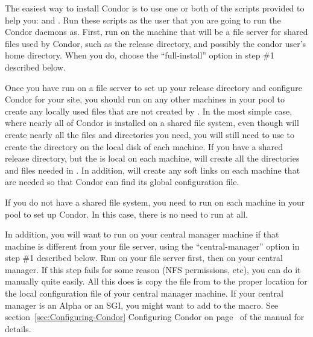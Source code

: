 The easiest way to install Condor is to use one or both of the scripts
provided to help you:  and .
Run these scripts as the user that you are going to run the Condor
daemons as.  First, run  on the machine that will be a
file server for shared files used by Condor, such as the release
directory, and possibly the condor user's home directory.  When you
do, choose the ``full-install'' option in step \#1 described below.

Once you have run  on a file server to set up your
release directory and configure Condor for your site, you should run
 on any other machines in your pool to create any locally
used files that are not created by .  In the most
simple case, where nearly all of Condor is installed on a shared file
system, even though  will create nearly all the files
and directories you need, you will still need to use  to
create the  directory on the local disk of each machine.
If you have a shared release directory, but the  is
local on each machine,  will create all the directories
and files needed in .  In addition, 
will create any soft links on each machine that are needed so that
Condor can find its global configuration file.

If you do not have a shared file system, you need to run
 on each machine in your pool to set up Condor.  In
this case, there is no need to run  at all.

In addition, you will want to run  on your central
manager machine if that machine is different from your file server,
using the ``central-manager'' option in step \#1 described below.  Run
 on your file server first, then on your central
manager.  If this step fails for some reason (NFS permissions, etc),
you can do it manually quite easily.  All this does is copy the
 file from
 to the proper location for the local configuration
file of your central manager machine.  If your central manager is an
Alpha or an SGI, you might want to add  to the
 macro.  See
section~\ref{sec:Configuring-Condor} Configuring Condor on
page~\pageref{sec:Configuring-Condor} of the manual for details.

